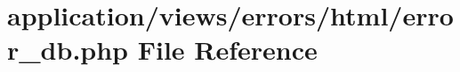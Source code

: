 \hypertarget{html_2error__db_8php}{}\section{application/views/errors/html/error\+\_\+db.php File Reference}
\label{html_2error__db_8php}
